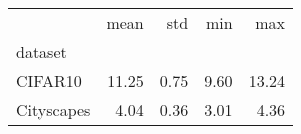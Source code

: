 \begin{tabular}{lrrrr}
\toprule
 & mean & std & min & max \\
dataset &  &  &  &  \\
\midrule
CIFAR10 & 11.25 & 0.75 & 9.60 & 13.24 \\
Cityscapes & 4.04 & 0.36 & 3.01 & 4.36 \\
\bottomrule
\end{tabular}
